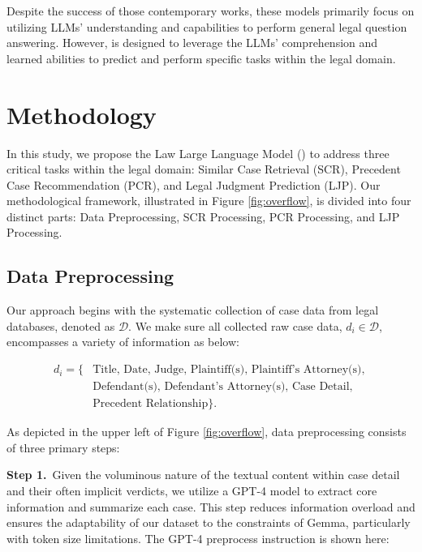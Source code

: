 Despite the success of those contemporary works, these models primarily focus on utilizing LLMs' understanding and capabilities to perform general legal question answering. However, \sysname is designed to leverage the LLMs' comprehension and learned abilities to predict and perform specific tasks within the legal domain.

\section{Methodology}

In this study, we propose the Law Large Language Model (\sysname) to address three critical tasks within the legal domain: Similar Case Retrieval (SCR), Precedent Case Recommendation (PCR), and Legal Judgment Prediction (LJP). Our methodological framework, illustrated in Figure \ref{fig:overflow}, is divided into four distinct parts: Data Preprocessing, SCR Processing, PCR Processing, and LJP Processing.

\subsection{Data Preprocessing}

Our approach begins with the systematic collection of case data from legal databases, denoted as \( \mathcal{D} \). We make sure all collected raw case data, \( d_i \in \mathcal{D} \), encompasses a variety of information as below:

\begin{equation}
\begin{aligned}
d_i = \{& \text{Title, } \text{Date, } \text{Judge, } \text{Plaintiff(s), } \text{Plaintiff's Attorney(s), }\\ 
& \text{Defendant(s), }\text{Defendant's Attorney(s), } \text{Case Detail, } \\
& \text{Precedent Relationship}\}.
\end{aligned}
\end{equation}

As depicted in the upper left of Figure \ref{fig:overflow}, data preprocessing consists of three primary steps:

\vspace{3pt}\noindent\textbf{Step 1.}\, Given the voluminous nature of the textual content within case detail and their often implicit verdicts, we utilize a GPT-4 \cite{achiam2023gpt} model to extract core information and summarize each case. This step reduces information overload and ensures the adaptability of our dataset to the constraints of Gemma, particularly with token size limitations. The GPT-4 preprocess instruction is shown here: 

